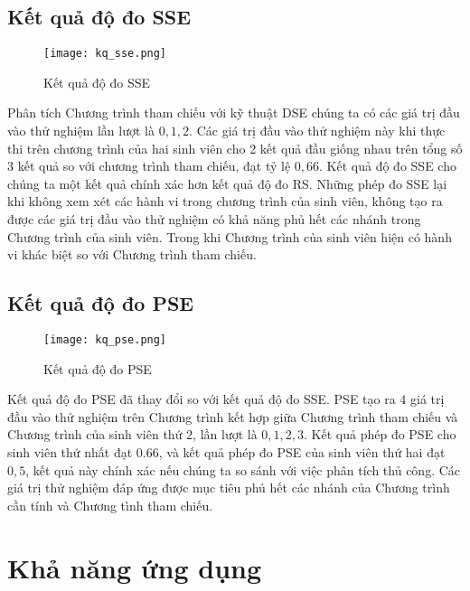 \subsection{Kết quả độ đo SSE}

\begin{center}
  \begin{figure}[h]
    \begin{center}
      \texttt{[image: kq\_sse.png]}
    \end{center}
    \caption{Kết quả độ đo SSE}
  \end{figure}
\end{center}

Phân tích Chương trình tham chiếu với kỹ thuật DSE chúng ta có các giá
trị đầu vào thử nghiệm lần lượt là $0, 1, 2$. Các giá trị đầu vào thử
nghiệm này khi thực thi trên chương trình của hai sinh viên cho 2 kết
quả đầu giống nhau trên tổng số 3 kết quả so với chương trình tham
chiếu, đạt tỷ lệ $0,66$. Kết quả độ đo SSE cho chúng ta một kết quả
chính xác hơn kết quả độ đo RS. Những phép đo SSE lại khi không xem
xét các hành vi trong chương trình của sinh viên, không tạo ra được
các giá trị đầu vào thử nghiệm có khả năng phủ hết các nhánh trong
Chương trình của sinh viên. Trong khi Chương trình của sinh viên hiện
có hành vi khác biệt so với Chương trình tham chiếu.

\subsection{Kết quả độ đo PSE}
\begin{center}
	\begin{figure}[h]
		\begin{center}
			\texttt{[image: kq\_pse.png]}
		\end{center}
		\caption{Kết quả độ đo PSE}		
	\end{figure}
\end{center}

Kết quả độ đo PSE đã thay đổi so với kết quả độ đo SSE. PSE tạo ra $4$
giá trị đầu vào thử nghiệm trên Chương trình kết hợp giữa Chương trình
tham chiếu và Chương trình của sinh viên thứ $2$, lần lượt là
$0, 1, 2, 3$. Kết quả phép đo PSE cho sinh viên thứ nhất đạt $0.66$,
và kết quả phép đo PSE của sinh viên thứ hai đạt $0,5$, kết quả này
chính xác nếu chúng ta so sánh với việc phân tích thủ công. Các giá
trị thử nghiệm đáp ứng được mục tiêu phủ hết các nhánh của Chương
trình cần tính và Chương tình tham chiếu.

\section{Khả năng ứng dụng}


